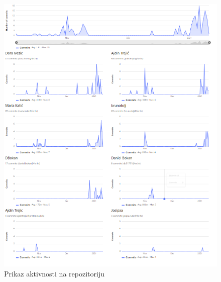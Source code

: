 		\begin{figure}[H]
			\includegraphics[scale=0.9]{slike/aktivnost.PNG} %
			\centering
			\caption{Prikaz aktivnosti na repozitoriju}
			\label{fig:promjene}
		\end{figure}
					
					
		\eject
		
	